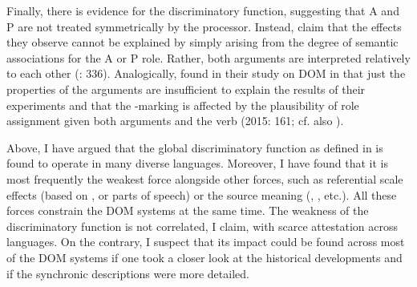 \documentclass[output=paper]{langsci/langscibook}
\begin{document}
Finally, there is  evidence for the discriminatory function, suggesting that A and P are not treated symmetrically by the processor. Instead, \citet{Bornkessel-SchlesewskySchlesewsky2015} claim that the effects they observe cannot be explained by simply arising from the degree of semantic associations for the A or P role. Rather, both arguments are interpreted relatively to each other (\citealt{Bornkessel-SchlesewskySchlesewsky2015}: 336). Analogically, \citet{KurumadaJaeger2015} found in their  study on DOM in  that just the properties of the arguments are insufficient to explain the results of their experiments and that the -marking is affected by the plausibility of role assignment given both arguments and the verb (2015: 161; cf. also \citealt{AhnCho2007,FedzechkinaEtAl2012}).

Above, I have argued that the global discriminatory function as defined in  is found to operate in many diverse languages. Moreover, I have found that it is most frequently the weakest force alongside other forces, such as referential scale effects (based on ,  or parts of speech) or the source meaning (, , etc.). All these forces constrain the DOM systems at the same time. The weakness of the discriminatory function is not correlated, I claim, with scarce attestation across languages. On the contrary, I suspect that its impact could be found across most of the DOM systems if one took a closer look at the historical developments and if the synchronic descriptions were more detailed. 
\end{document}
